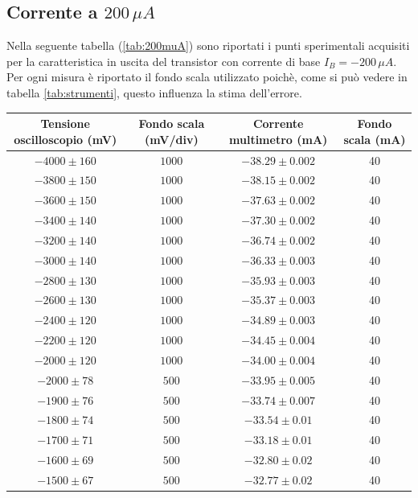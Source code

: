 \documentclass[]{article}
\begin{document}
\subsection{Corrente a $ 200\,\mu A $}
Nella seguente tabella (\ref{tab:200muA}) sono riportati i punti sperimentali acquisiti per la caratteristica in uscita del transistor con corrente di base $ I_{B}= -200\,\mu A $. Per ogni misura è riportato il fondo scala utilizzato poichè, come si può vedere in tabella \ref{tab:strumenti}, questo influenza la stima dell'errore.
	\begin{table}[H]
		\centering
	\begin{tabular}{|c|c|c|c|}
		\hline
		Tensione oscilloscopio (mV)& Fondo scala (mV/div) & Corrente multimetro (mA) &Fondo scala (mA)\\
		\hline
		$ -4000\pm 160 $ &$ 1000 $ & $ -38.29\pm 0.002 $ &40\\
		\hline
		$-3800\pm150 $ &$ 1000 $ & $ -38.15\pm0.002 $ &40 \\
		\hline
		$ -3600\pm 150 $ &$ 1000 $ & $ -37.63\pm 0.002 $ &40 \\
		\hline
		$ -3400\pm 140 $ &$ 1000 $ & $ -37.30\pm 0.002 $ &40 \\
		\hline
		$ -3200\pm 140 $ &$ 1000 $ & $-36.74\pm 0.002$ &40 \\
		\hline
		$ -3000\pm 140 $ &$ 1000 $ & $ -36.33\pm 0.003 $ &40 \\
		\hline
		$ -2800\pm 130 $ &$ 1000 $ & $ -35.93\pm 0.003 $ &40 \\
		\hline
		$ -2600\pm 130 $ &$ 1000 $ & $ -35.37\pm 0.003 $ &40 \\
		\hline
		$ -2400\pm 120 $ &$ 1000 $ & $ -34.89\pm 0.003 $ &40 \\
		\hline
		$ -2200\pm 120 $ &$ 1000 $ & $ -34.45\pm 0.004 $ &40 \\
		\hline
		$ -2000\pm 120 $ &$ 1000 $ & $ -34.00\pm0.004 $  &40\\
		\hline
		$ -2000\pm 78 $ &$ 500 $ & $ -33.95\pm0.005 $  &40\\
		\hline
		$ -1900\pm 76 $ &$ 500 $ & $ -33.74\pm0.007 $  &40\\
		\hline
		$ -1800\pm 74 $ &$ 500 $ & $ -33.54\pm 0.01 $ &40 \\
		\hline
		$ -1700\pm 71 $ &$ 500 $ & $ -33.18\pm 0.01 $ &40 \\
		\hline
		$ -1600\pm 69 $ &$ 500 $ & $ -32.80\pm 0.02 $ &40 \\
		\hline
		$ -1500\pm 67 $ &$ 500 $ & $ -32.77\pm 0.02 $ &40 \\

\end{tabular}
\end{table}
\end{document}
